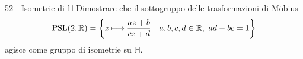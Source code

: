 \documentclass[a4paper]{article}
\begin{document}
%
%
%
%

\begin{snippetexercise}{52 - Isometrie di \(\mathbb{H}\)}
    Dimostrare che il sottogruppo delle trasformazioni di Möbius
    \[
        \operatorname{PSL}(2,\mathbb{R})
        =
        \left\{
            z\longmapsto \frac{az+b}{cz+d}
            \ \middle|\
            a,b,c,d\in\mathbb{R},\ ad-bc=1
        \right\}
    \]
    agisce come gruppo di isometrie su \(\mathbb{H}\).
\end{snippetexercise}
\end{document}
